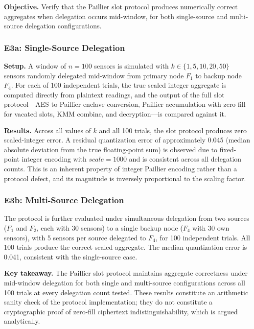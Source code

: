 \documentclass[conference]{IEEEtran}
\begin{document}
    \textbf{Objective.} Verify that the Paillier slot protocol produces numerically correct aggregates when delegation occurs mid-window, for both single-source and multi-source delegation configurations.

    \subsubsection{E3a: Single-Source Delegation}
    \textbf{Setup.} A window of $n=100$ sensors is simulated with $k\in\{1,5,10,20,50\}$ sensors randomly delegated mid-window from primary node $F_1$ to backup node $F_4$. For each of 100 independent trials, the true scaled integer aggregate is computed directly from plaintext readings, and the output of the full slot protocol---AES-to-Paillier enclave conversion, Paillier accumulation with zero-fill for vacated slots, KMM combine, and decryption---is compared against it.

    \textbf{Results.} Across all values of $k$ and all 100 trials, the slot protocol produces zero scaled-integer error. A residual quantization error of approximately 0.045 (median absolute deviation from the true floating-point sum) is observed due to fixed-point integer encoding with $scale=1000$ and is consistent across all delegation counts. This is an inherent property of integer Paillier encoding rather than a protocol defect, and its magnitude is inversely proportional to the scaling factor.

    \subsubsection{E3b: Multi-Source Delegation}
    The protocol is further evaluated under simultaneous delegation from two sources ($F_1$ and $F_2$, each with 30 sensors) to a single backup node ($F_4$ with 30 own sensors), with 5 sensors per source delegated to $F_4$, for 100 independent trials. All 100 trials produce the correct scaled aggregate. The median quantization error is 0.041, consistent with the single-source case.

    \textbf{Key takeaway.} The Paillier slot protocol maintains aggregate correctness under mid-window delegation for both single and multi-source configurations across all 100 trials at every delegation count tested. These results constitute an arithmetic sanity check of the protocol implementation; they do not constitute a cryptographic proof of zero-fill ciphertext indistinguishability, which is argued analytically.
\end{document}
